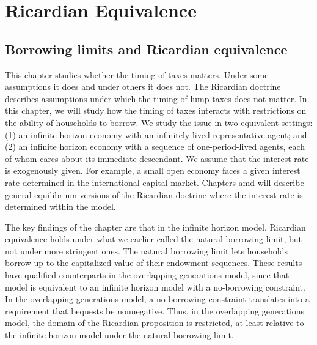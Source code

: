 

%




\hbox{}

\def\toone{{t+1}}
\def\ttwo{{t+2}}
\def\tthree{{t+3}}
\def\Tone{{T+1}}
\def\TTT{{T-1}}
\def\rtr{{\rm tr}}

\chapter{Ricardian Equivalence\label{ricardian}}

\section{Borrowing limits and Ricardian equivalence}

  This chapter studies whether the timing of taxes
matters.  Under some assumptions it does and under others it does
not.  The Ricardian doctrine describes assumptions under
which the timing of lump taxes does not matter.
In this chapter, we will study how the timing of taxes interacts
with restrictions on the ability of households to borrow.  We study
the issue in two equivalent settings:
(1) an infinite horizon economy with an infinitely lived
representative agent; and (2) an infinite horizon economy
with a sequence of one-period-lived agents, each of whom cares
about its immediate descendant. We assume that
the interest rate is exogenously given. For example,
a small open economy  faces a given
interest rate determined in the
international capital market. Chapters  amd   will describe
 general equilibrium
versions  of the Ricardian doctrine where the interest
rate is determined within the model.

  The key findings of the chapter are that in the infinite horizon
model, Ricardian equivalence holds under what  we earlier
called the natural borrowing limit, %
but not under more stringent ones.  The natural borrowing limit
 lets households borrow up to the capitalized
value of their endowment sequences.  These results have qualified counterparts
in the overlapping generations model, since that model is equivalent
to an infinite horizon model with a  no-borrowing constraint.
  In the overlapping generations model,
a no-borrowing constraint translates into a requirement
that bequests be nonnegative.
Thus, in the overlapping generations  model, the domain
of the Ricardian proposition is restricted, at least relative
to the infinite horizon model under the natural borrowing limit.


